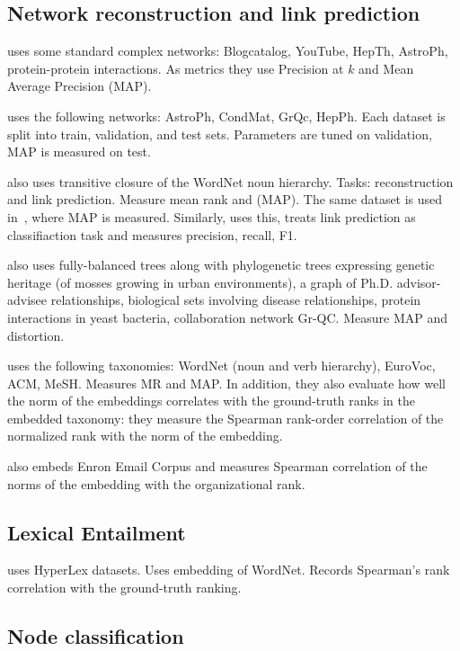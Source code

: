 \documentclass{article}
\begin{document}
\subsection{Network reconstruction and link prediction}

\cite{goyal2018graph} uses some standard complex networks: Blogcatalog, YouTube, HepTh, AstroPh, protein-protein interactions. As metrics they use Precision at $k$ and Mean Average Precision (MAP).

\cite{nickel2017poincare} uses the following networks: AstroPh, CondMat, GrQc, HepPh. Each dataset is split into train, validation, and test sets. Parameters are tuned on validation, MAP is measured on test. 

\cite{nickel2017poincare} also uses transitive closure of the WordNet noun hierarchy. Tasks: reconstruction and link prediction. Measure mean rank and (MAP).  The same dataset is used in~\cite{sala2018representation}, where MAP is measured. Similarly, \cite{ganea2018hyperbolic} uses this, treats link prediction as classifiaction task and measures precision, recall, F1.

\cite{sala2018representation} also uses fully-balanced trees along with phylogenetic trees expressing genetic heritage (of mosses growing in urban
environments), a graph of Ph.D. advisor-advisee relationships, biological sets involving disease relationships, protein interactions in yeast bacteria, collaboration network Gr-QC. Measure MAP and distortion. 

\cite{nickel2018learning} uses the following taxonomies: WordNet (noun and verb hierarchy), EuroVoc, ACM, MeSH. Measures MR and MAP. In addition, they also evaluate how well the norm of the embeddings  correlates with
the ground-truth ranks in the embedded taxonomy: they measure the Spearman rank-order correlation of the normalized rank with the norm of the embedding. 
 
\cite{nickel2018learning} also embeds Enron Email Corpus and measures Spearman correlation of the norms of the embedding with
the organizational rank.

 
\subsection{Lexical Entailment}

\cite{nickel2017poincare} uses HyperLex datasets. Uses embedding of WordNet. Records Spearman’s rank correlation
with the ground-truth ranking. 

\subsection{Node classification}
\end{document}
